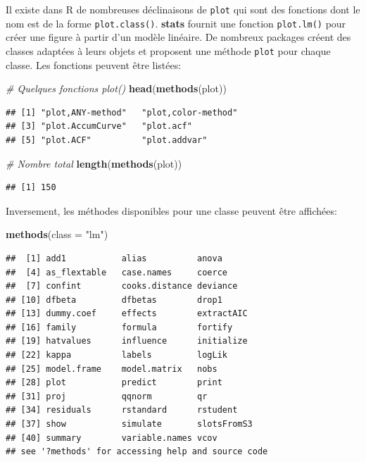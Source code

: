 \documentclass[
  12pt,
  french,
  a4paper,
  extrafontsizes,onecolumn,openright
  ]{memoir}
\newenvironment{Shaded}{\begin{snugshade}}{\end{snugshade}}
\newcommand{\CommentTok}[1]{\textcolor[rgb]{0.56,0.35,0.01}{\textit{#1}}}
\newcommand{\DataTypeTok}[1]{\textcolor[rgb]{0.13,0.29,0.53}{#1}}
\newcommand{\KeywordTok}[1]{\textcolor[rgb]{0.13,0.29,0.53}{\textbf{#1}}}
\newcommand{\NormalTok}[1]{#1}
\newcommand{\StringTok}[1]{\textcolor[rgb]{0.31,0.60,0.02}{#1}}
\begin{document}
\normalsize

Il existe dans R de nombreuses déclinaisons de \texttt{plot} qui sont des fonctions dont le nom est de la forme \texttt{plot.class()}.
\textbf{stats} fournit une fonction \texttt{plot.lm()} pour créer une figure à partir d'un modèle linéaire.
De nombreux packages créent des classes adaptées à leurs objets et proposent une méthode \texttt{plot} pour chaque classe.
Les fonctions peuvent être listées:

\scriptsize

\begin{Shaded}
\begin{Highlighting}[]
\CommentTok{# Quelques fonctions plot()}
\KeywordTok{head}\NormalTok{(}\KeywordTok{methods}\NormalTok{(plot))}
\end{Highlighting}
\end{Shaded}

\begin{verbatim}
## [1] "plot,ANY-method"   "plot,color-method"
## [3] "plot.AccumCurve"   "plot.acf"         
## [5] "plot.ACF"          "plot.addvar"
\end{verbatim}

\begin{Shaded}
\begin{Highlighting}[]
\CommentTok{# Nombre total}
\KeywordTok{length}\NormalTok{(}\KeywordTok{methods}\NormalTok{(plot))}
\end{Highlighting}
\end{Shaded}

\begin{verbatim}
## [1] 150
\end{verbatim}

\normalsize
Inversement, les méthodes disponibles pour une classe peuvent être affichées:

\scriptsize

\begin{Shaded}
\begin{Highlighting}[]
\KeywordTok{methods}\NormalTok{(}\DataTypeTok{class =} \StringTok{"lm"}\NormalTok{)}
\end{Highlighting}
\end{Shaded}

\begin{verbatim}
##  [1] add1           alias          anova         
##  [4] as_flextable   case.names     coerce        
##  [7] confint        cooks.distance deviance      
## [10] dfbeta         dfbetas        drop1         
## [13] dummy.coef     effects        extractAIC    
## [16] family         formula        fortify       
## [19] hatvalues      influence      initialize    
## [22] kappa          labels         logLik        
## [25] model.frame    model.matrix   nobs          
## [28] plot           predict        print         
## [31] proj           qqnorm         qr            
## [34] residuals      rstandard      rstudent      
## [37] show           simulate       slotsFromS3   
## [40] summary        variable.names vcov          
## see '?methods' for accessing help and source code
\end{verbatim}
\end{document}
